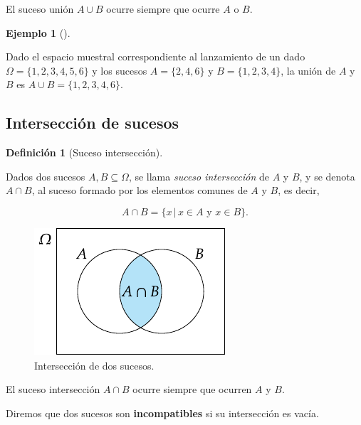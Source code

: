 \documentclass[
  a4paper,
]{scrreport}
\theoremstyle{plain}
\theoremstyle{definition}
\newtheorem{definition}{Definición}[chapter]
\theoremstyle{definition}
\newtheorem{example}{Ejemplo}[chapter]
\theoremstyle{remark}
\begin{document}
El suceso unión \(A\cup B\) ocurre siempre que ocurre \(A\) {o} \(B\).

\begin{example}[]\protect\hypertarget{exm-union-sucesos}{}\label{exm-union-sucesos}

Dado el espacio muestral correspondiente al lanzamiento de un dado
\(\Omega=\{1,2,3,4,5,6\}\) y los sucesos \(A=\{2,4,6\}\) y
\(B=\{1,2,3,4\}\), la unión de \(A\) y \(B\) es
\(A\cup B=\{1,2,3,4,6\}\).

\end{example}

\subsection{Intersección de sucesos}\label{intersecciuxf3n-de-sucesos}

\begin{definition}[Suceso
intersección]\protect\hypertarget{def-interseccion-sucesos}{}\label{def-interseccion-sucesos}

Dados dos sucesos \(A,B\subseteq \Omega\), se llama \emph{suceso
intersección} de \(A\) y \(B\), y se denota \(A\cap B\), al suceso
formado por los elementos comunes de \(A\) y \(B\), es decir,

\[A\cap B = \{x\,|\, x\in A\mbox{ y }x\in B\}.\]

\end{definition}

\begin{figure}[H]

{\centering \includegraphics{img/probabilidad/interseccion.pdf}

}

\caption{Intersección de dos sucesos.}

\end{figure}%

El suceso intersección \(A\cap B\) ocurre siempre que ocurren \(A\) {y}
\(B\).

Diremos que dos sucesos son \textbf{incompatibles} si su intersección es
vacía.
\end{document}
